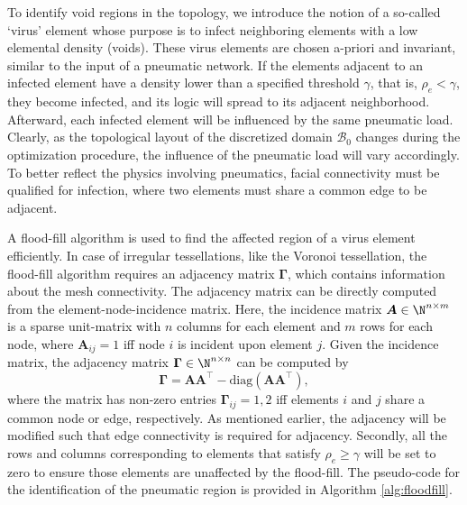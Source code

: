 To identify void regions in the topology, we introduce the notion of a so-called `virus' element whose purpose is to infect neighboring elements with a low elemental density (voids). These virus elements are chosen a-priori and invariant, similar to the input of a pneumatic network. If the elements adjacent to an infected element have a density lower than a specified threshold $\gamma$, that is, $\rho_e < \gamma$, they become infected, and its logic will spread to its adjacent neighborhood. Afterward, each infected element will be influenced by the same pneumatic load. Clearly, as the topological layout of the discretized domain $\mathcal{B}_0$ changes during the optimization procedure, the influence of the pneumatic load will vary accordingly. To better reflect the physics involving pneumatics, facial connectivity must be qualified for infection, where two elements must share a common edge to be adjacent. 

A flood-fill algorithm is used \cite{chartrand1977} to find the affected region of a virus element efficiently. In case of irregular tessellations, like the Voronoi tessellation, the flood-fill algorithm requires an adjacency matrix $\boldsymbol{\Gamma}$, which contains information about the mesh connectivity. The adjacency matrix can be directly computed from the element-node-incidence matrix. Here, the incidence matrix $\boldsymbol{A} \in \N^{n\times m}$ is a sparse unit-matrix with $n$ columns for each element and $m$ rows for each node, where $\boldsymbol{A}_{ij} = 1$ iff node $i$ is incident upon element $j$. Given the incidence matrix, the adjacency matrix $\boldsymbol{\Gamma}\in \N^{n\times n}$ can be computed by
%
\begin{equation}
\boldsymbol{\Gamma} = \boldsymbol{A}\boldsymbol{A}^\top - \text{diag}(\boldsymbol{A}\boldsymbol{A}^\top), \label{eq:adjecency}
\end{equation}
%
where the matrix has non-zero entries $\boldsymbol{\Gamma}_{ij} = 1,2$ iff elements $i$ and $j$ share a common node or edge, respectively. As mentioned earlier, the adjacency will be modified such that edge connectivity is required for adjacency. Secondly, all the rows and columns corresponding to elements that satisfy $\rho_e \ge \gamma$ will be set to zero to ensure those elements are unaffected by the flood-fill. The pseudo-code for the identification of the pneumatic region is provided in Algorithm \ref{alg:floodfill}.

